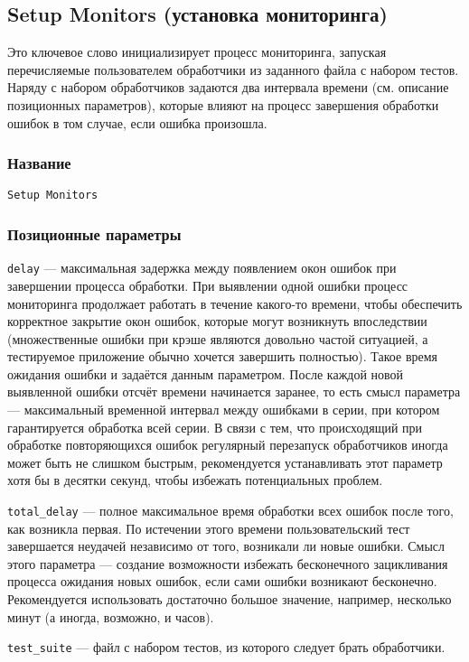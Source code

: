 \documentclass[11pt]{book} %
\begin{document}
\subsection{Setup Monitors (установка мониторинга)}
Это ключевое слово инициализирует процесс мониторинга, запуская перечисляемые пользователем обработчики из заданного файла с набором тестов. Наряду с набором обработчиков задаются два интервала времени (см. описание позиционных параметров), которые влияют на процесс завершения обработки ошибок в том случае, если ошибка произошла.

\subsubsection*{Название} 
\verb"Setup Monitors"

\subsubsection*{Позиционные параметры} 
\verb"delay" --- максимальная задержка между появлением окон ошибок при завершении процесса обработки. При выявлении одной ошибки процесс мониторинга продолжает работать в течение какого-то времени, чтобы обеспечить корректное закрытие окон ошибок, которые могут возникнуть впоследствии (множественные ошибки при крэше являются довольно частой ситуацией, а тестируемое приложение обычно хочется завершить полностью). Такое время ожидания ошибки и задаётся данным параметром. После каждой новой выявленной ошибки отсчёт времени начинается заранее, то есть смысл параметра --- максимальный временной интервал между ошибками в серии, при котором гарантируется обработка всей серии. В связи с тем, что происходящий при обработке повторяющихся ошибок регулярный перезапуск обработчиков иногда может быть не слишком быстрым, рекомендуется устанавливать этот параметр хотя бы в десятки секунд, чтобы избежать потенциальных проблем.

\verb"total_delay" --- полное максимальное время обработки всех ошибок после того, как возникла первая. По истечении этого времени пользовательский тест завершается неудачей независимо от того, возникали ли новые ошибки. Смысл этого параметра --- создание возможности избежать бесконечного зацикливания процесса ожидания новых ошибок, если сами ошибки возникают бесконечно. Рекомендуется использовать достаточно большое значение, например, несколько минут (а иногда, возможно, и часов).

\verb"test_suite" --- файл с набором тестов, из которого следует брать обработчики.
\end{document}
